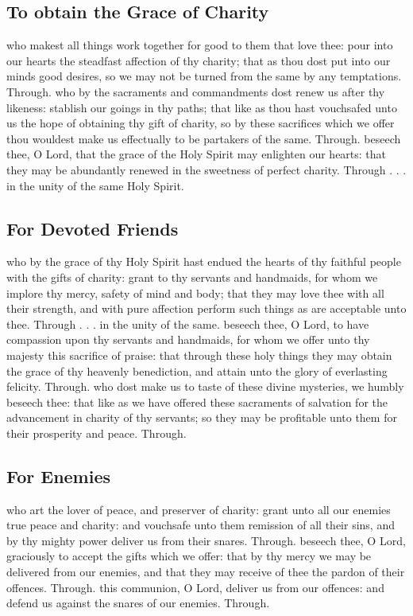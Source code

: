 \begin{multicols}{2}
\subsection{To obtain the Grace of Charity}
\collect
{} who makest all things work together for good to them that love thee: pour into our hearts the steadfast affection of thy charity; that as thou dost put into our minds good desires, so we may not be turned from the same by any temptations. Through.
\secret
{} who by the sacraments and commandments dost renew us after thy likeness: stablish our goings in thy paths; that like as thou hast vouchsafed unto us the hope of obtaining thy gift of charity, so by these sacrifices which we offer thou wouldest make us effectually to be partakers of the same. Through.
\postcommunion
{} beseech thee, O Lord, that the grace of the Holy Spirit may enlighten our hearts: that they may be abundantly renewed in the sweetness of perfect charity. Through . . . in the unity of the same Holy Spirit.

   \newcolumn

\subsection{For Devoted Friends}
\collect
{} who by the grace of thy Holy Spirit hast endued the hearts of thy faithful people with the gifts of charity: grant to thy servants and handmaids, for whom we implore thy mercy, safety of mind and body; that they may love thee with all their strength, and with pure affection perform such things as are acceptable unto thee. Through . . . in the unity of the same.
\secret
{} beseech thee, O Lord, to have compassion upon thy servants and handmaids, for whom we offer unto thy majesty this sacrifice of praise: that through these holy things they may obtain the grace of thy heavenly benediction, and attain unto the glory of everlasting felicity. Through.
\postcommunion
{} who dost make us to taste of these divine mysteries, we humbly beseech thee: that like as we have offered these sacraments of salvation for the advancement in charity of thy servants; so they may be profitable unto them for their prosperity and peace. Through.

   \newcolumn

\subsection{For Enemies}
\collect
{} who art the lover of peace, and preserver of charity: grant unto all our enemies true peace and charity: and vouchsafe unto them remission of all their sins, and by thy mighty power deliver us from their snares. Through.
\secret
{} beseech thee, O Lord, graciously to accept the gifts which we offer: that by thy mercy we may be delivered from our enemies, and that they may receive of thee the pardon of their offences. Through.
\postcommunion
{} this communion, O Lord, deliver us from our offences: and defend us against the snares of our enemies. Through.


\end{multicols}
